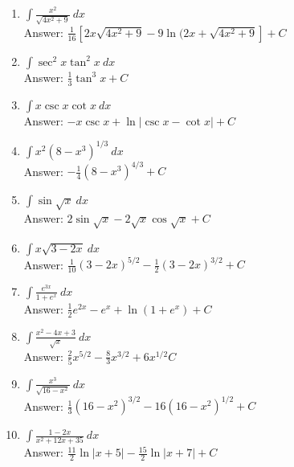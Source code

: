\documentclass[11pt]{report}
\newcommand{\ds}{\displaystyle}
\begin{document}
\begin{enumerate}
\item $\ds \int \frac{x^2}{\sqrt{4x^2+9}}~dx$\\
Answer: $\ds \frac{1}{16}[2x\sqrt{4x^2+9} - 9\ln(2x + \sqrt{4x^2+9}]+C$\\

\item $\ds \int \sec^2 x \tan^2 x~dx$\\
Answer: $\ds\frac{1}{3} \tan^3 x +C$\\

\item $\ds \int x\csc x \cot x~dx$\\
Answer: $\ds -x\csc x + \ln |\csc x - \cot x| +C$\\

\item $\ds \int x^2 (8-x^3)^{1/3}~dx$\\
Answer: $\ds -\frac{1}{4}(8-x^3)^{4/3}+C$\\

\item $\ds \int \sin \sqrt{x}~dx$\\
Answer: $\ds 2 \sin \sqrt{x} -2 \sqrt{x} \cos\sqrt{x} +C$\\

\item $\ds \int x \sqrt{3-2x}~dx$\\
Answer: $\ds \frac{1}{10} (3-2x)^{5/2} -\frac{1}{2} (3-2x)^{3/2}+C$\\

\item $\ds \int\frac{e^{3x}}{1+e^x}~dx$\\
Answer: $\ds \frac{1}{2} e^{2x} - e^x +\ln(1+e^x)+C$\\

\item $\ds \int\frac{x^2-4x+3}{\sqrt x}~dx$\\
Answer: $\ds \frac{2}{5} x^{5/2} - \frac{8}{3} x^{3/2}+ 6 x^{1/2}C$\\

\item $\ds \int \frac{x^3}{\sqrt{16-x^2}}~dx$\\
Answer: $\ds \frac{1}{3}(16-x^2)^{3/2} - 16(16-x^2)^{1/2}+C$\\

\item $\ds \int \frac{1-2x}{x^2+12x+35}~dx$\\
Answer: $\ds \frac{11}{2}\ln |x+5| - \frac{15}{2}\ln|x+7|+C$\\


\end{enumerate}
\end{document}

